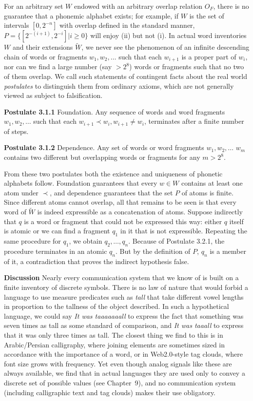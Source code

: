 For an arbitrary set $W$ endowed with an arbitrary overlap relation $O_F$,
there is no guarantee that a phonemic alphabet exists; for example, if $W$ is
the set of intervals $[0,2^{-n}]$ with overlap defined in the standard manner,
$P = \{[2^{-(i+1)},2^{-i}]| i \geq 0\}$ will enjoy (ii) but not (i). In actual
word inventories $W$ and their extensions $\tilde{W}$, we never see the
phenomenon of an infinite descending chain of words or fragments $w_1, w_2,
\ldots$ such that each $w_{i+1}$ is a proper part of $w_{i}$, nor can we find
a large number (say $>2^8$) words or fragments such that no two of them
overlap. We call such statements of contingent facts about the real world {\it
postulates} to distinguish them from ordinary axioms, which are not generally
viewed as subject to falsification.

\smallskip\noindent
{\bf Postulate 3.1.1} Foundation. Any sequence of words and word fragments
$w_1, w_2, \ldots$ such that each $w_{i+1} \prec w_i, w_{i+1} \neq w_i$,
terminates after a finite number of steps.

\smallskip\noindent
{\bf Postulate 3.1.2} Dependence. Any set of words or word fragments $w_1,
w_2, \ldots$ $w_m$ contains two different but overlapping words or fragments
for any $m > 2^8$.

From these two postulates both the existence and uniqueness of phonetic
alphabets follow. Foundation guarantees that every $w \in W$ contains at least
one atom under $\prec$, and dependence guarantees that the set $P$ of atoms is
finite.  Since different atoms cannot overlap, all that remains to be seen is
that every word of $\tilde{W}$ is indeed expressible as a concatenation of
atoms. Suppose indirectly that $q$ is a word or fragment that could not be
expressed this way: either $q$ itself is atomic or we can find a fragment
$q_1$ in it that is not expressible. Repeating the same procedure for $q_1$,
we obtain $q_2, \ldots, q_n$. Because of Postulate 3.2.1, the procedure
terminates in an atomic $q_n$. But by the definition of $P$, $q_n$ is a member
of it, a contradiction that proves the indirect hypothesis false.

\smallskip\noindent
{\bf Discussion} Nearly every communication system that we know of is built on
a finite inventory of discrete symbols. There is no law of nature that would
forbid a language to use measure predicates such as {\it tall} that take
different vowel lengths in proportion to the tallness of the object described.
In such a hypothetical language, we could say {\it It was taaaaaaall} to
express the fact that something was seven times as tall as some standard of
comparison, and {\it It was taaall} to express that it was only three times as
tall. The closest thing we find to this is in Arabic/Persian calligraphy,
where joining elements are sometimes sized in accordance with the importance
of a word, or in Web2.0-style tag clouds, where font size grows with frequency.
Yet even though analog signals like these are always available, we find that
in actual languages they are used only to convey a discrete set of possible
values (see Chapter~9), and no communication system (including calligraphic 
text and tag clouds) makes their use obligatory. 

